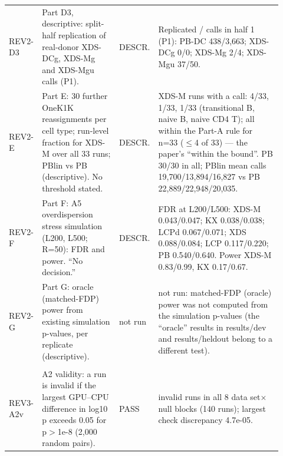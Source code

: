 \begin{table}[p]
\begin{tabular}{@{}>{\raggedright\arraybackslash}p{0.100\linewidth}>{\raggedright\arraybackslash}p{0.285\linewidth}>{\raggedright\arraybackslash}p{0.085\linewidth}>{\raggedright\arraybackslash}p{0.450\linewidth}@{}}
REV2-D3 & Part D3, descriptive: split-half replication of real-donor XDS-DCg, XDS-Mg and XDS-Mgu calls (P1). & DESCR. & Replicated / calls in half 1 (P1): PB-DC 438/3,663; XDS-DCg 0/0; XDS-Mg 2/4; XDS-Mgu 37/50. \\
REV2-E & Part E: 30 further OneK1K reassignments per cell type; run-level fraction for XDS-M over all 33 runs; PBlin vs PB (descriptive). No threshold stated. & DESCR. & XDS-M runs with a call: 4/33, 1/33, 1/33 (transitional B, naive B, naive CD4 T); all within the Part-A rule for n=33 ($\le$4 of 33) --- the paper's ``within the bound''. PB 30/30 in all; PBlin mean calls 19,700/13,894/16,827 vs PB 22,889/22,948/20,035. \\
REV2-F & Part F: A5 overdispersion stress simulation (L200, L500; R=50): FDR and power. ``No decision.'' & DESCR. & FDR at L200/L500: XDS-M 0.043/0.047; KX 0.038/0.038; LCPd 0.067/0.071; XDS 0.088/0.084; LCP 0.117/0.220; PB 0.540/0.640. Power XDS-M 0.83/0.99, KX 0.17/0.67. \\
REV2-G & Part G: oracle (matched-FDP) power from existing simulation p-values, per replicate (descriptive). & not run & not run: matched-FDP (oracle) power was not computed from the simulation p-values (the ``oracle'' results in results/dev and results/heldout belong to a different test). \\
\addlinespace[3pt]
\multicolumn{4}{@{}>{\raggedright\arraybackslash}p{0.90\linewidth}}{\textbf{Plan 4 (REV3\_PREREG), with amendment 1}} \\
\cmidrule(lr){1-4}
REV3-A2v & A2 validity: a run is invalid if the largest GPU--CPU difference in log10 p exceeds 0.05 for p$>$1e-8 (2,000 random pairs). & PASS & 0 invalid runs in all 8 data set$\times$null blocks (140 runs); largest check discrepancy 4.7e-05. \\
\bottomrule
\end{tabular}
\end{table}

